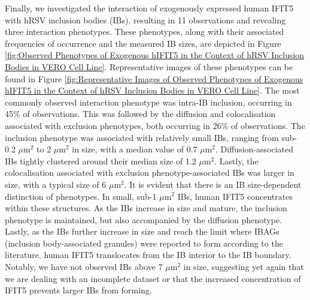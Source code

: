 Finally, we investigated the interaction of exogenously expressed human IFIT5 with hRSV inclusion bodies (IBs), resulting in 11 observations and revealing three interaction phenotypes. These phenotypes, along with their associated frequencies of occurrence and the measured IB sizes, are depicted in Figure \ref{fig:Observed Phenotypes of Exogenous hIFIT5 in the Context of hRSV Inclusion Bodies in VERO Cell Line}. Representative images of these phenotypes can be found in Figure \ref{fig:Representative Images of Observed Phenotypes of Exogenous hIFIT5 in the Context of hRSV Inclusion Bodies in VERO Cell Line}. The most commonly observed interaction phenotype was intra-IB inclusion, occurring in 45\% of observations. This was followed by the diffusion and colocalisation associated with exclusion phenotypes, both occurring in 26\% of observations. The inclusion phenotype was associated with relatively small IBs, ranging from sub-0.2 \(\mu \mbox{m}^2\) to 2 \(\mu \mbox{m}^2\) in size, with a median value of 0.7 \(\mu \mbox{m}^2\). Diffusion-associated IBs tightly clustered around their median size of 1.2 \(\mu \mbox{m}^2\). Lastly, the colocalisation associated with exclusion phenotype-associated IBs was larger in size, with a typical size of 6 \(\mu \mbox{m}^2\). It is evident that there is an IB size-dependent distinction of phenotypes. In small, sub-1 \(\mu \mbox{m}^2\) IBs, human IFIT5 concentrates within these structures. As the IBs increase in size and mature, the inclusion phenotype is maintained, but also accompanied by the diffusion phenotype. Lastly, as the IBs further increase in size and reach the limit where IBAGs (inclusion body-associated granules) were reported to form according to the literature, human IFIT5 translocates from the IB interior to the IB boundary. Notably, we have not observed IBs above 7 \(\mu \mbox{m}^2\) in size, suggesting yet again that we are dealing with an incomplete dataset or that the increased concentration of IFIT5 prevents larger IBs from forming.

